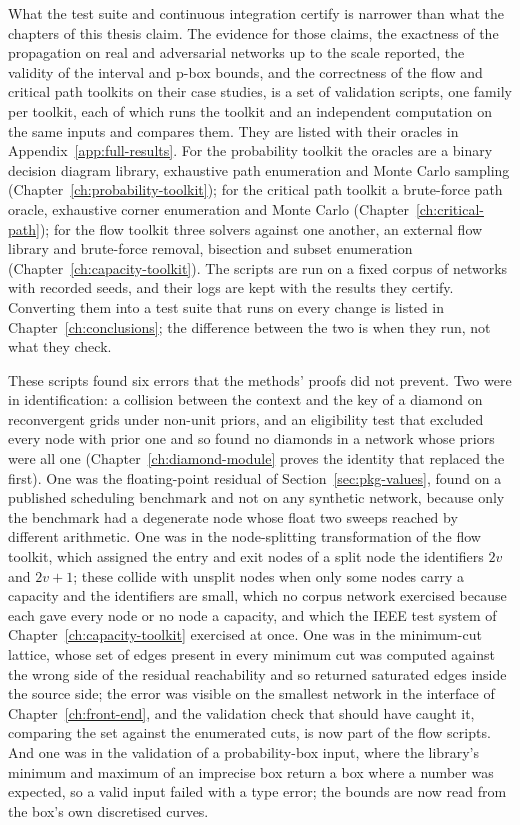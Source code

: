 \documentclass[12pt]{report}
\begin{document}
What the test suite and continuous integration certify is narrower than what the chapters
of this thesis claim. The evidence for those claims, the exactness of the propagation on
real and adversarial networks up to the scale reported, the validity of the interval and
p-box bounds, and the correctness of the flow and critical path toolkits on their case
studies, is a set of validation scripts, one family per toolkit, each of which runs the
toolkit and an independent computation on the same inputs and compares them. They are
listed with their oracles in Appendix~\ref{app:full-results}. For the probability toolkit
the oracles are a binary decision diagram library, exhaustive path enumeration and Monte
Carlo sampling (Chapter~\ref{ch:probability-toolkit}); for the critical path toolkit a
brute-force path oracle, exhaustive corner enumeration and Monte Carlo
(Chapter~\ref{ch:critical-path}); for
the flow toolkit three solvers against one another, an external flow library and brute-force
removal, bisection and subset enumeration (Chapter~\ref{ch:capacity-toolkit}). The scripts
are run on a fixed corpus of networks with recorded seeds, and their logs are kept with the
results they certify. Converting them into a test suite that runs on every change is listed
in Chapter~\ref{ch:conclusions}; the difference between the two is when they run, not what
they check.

These scripts found six errors that the methods' proofs did not prevent. Two were in identification: a collision between the context and the
key of a diamond on reconvergent grids under non-unit priors, and an eligibility test that
excluded every node with prior one and so found no diamonds in a network whose priors were
all one (Chapter~\ref{ch:diamond-module} proves the identity that replaced the first). One
was the floating-point residual of Section~\ref{sec:pkg-values}, found on a published
scheduling benchmark and not on any synthetic network, because only the benchmark had a
degenerate node whose float two sweeps reached by different arithmetic. One was in the
node-splitting transformation of the flow toolkit, which assigned the entry and exit nodes
of a split node the identifiers $2v$ and $2v+1$; these collide with unsplit nodes when only
some nodes carry a capacity and the identifiers are small, which no corpus network
exercised because each gave every node or no node a capacity, and which the IEEE test system
of Chapter~\ref{ch:capacity-toolkit} exercised at once. One was in the minimum-cut lattice,
whose set of edges present in every minimum cut was computed against the wrong side of the
residual reachability and so returned saturated edges inside the source side; the error
was visible on the smallest network in the interface of Chapter~\ref{ch:front-end}, and
the validation check that should have caught it, comparing the set against the enumerated
cuts, is now part of the flow scripts. And one was in the validation of a probability-box
input, where the library's minimum and maximum of an imprecise box return a box where a number was expected, so a valid input failed with a type error; the bounds are now read from the box's
own discretised curves.
\end{document}
